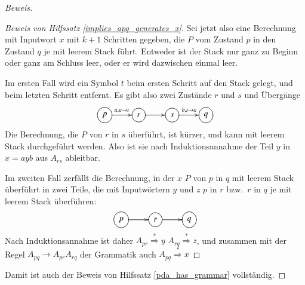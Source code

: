 \begin{proof}[Beweis]
\begin{proof}[Beweis von Hilfssatz \ref{implies_apq_generates_x}]
Sei jetzt also eine Berechnung mit Inputwort $x$
mit $k+1$ Schritten gegeben, die $P$ vom Zustand $p$ in den Zustand $q$ 
je mit leerem Stack führt. Entweder ist der Stack nur ganz zu
Beginn oder ganz am Schluss leer, oder er wird dazwischen einmal
leer.

Im ersten Fall wird ein Symbol $t$ beim ersten Schritt auf den Stack
gelegt, und beim letzten Schritt entfernt. Es gibt also zwei Zustände
$r$ und $s$ und Übergänge
\[
\entrymodifiers={++[o][F]}
\xymatrix{
p\ar[r]^{a,\varepsilon\to t}
	&r\ar[r]
		&s\ar[r]^{b,t\to\varepsilon}
			&q
}
\]
Die Berechnung, die $P$ von $r$ in $s$ überführt, ist kürzer, und kann
mit leerem Stack durchgeführt werden.
Also ist sie nach Induktionsannahme der Teil $y$ in $x=ayb$ aus
$A_{rs}$ ableitbar.

Im zweiten Fall zerfällt die Berechnung, in der $x$ $P$ von $p$ in
$q$  mit leerem Stack überführt in zwei Teile, die mit Inputwörtern
$y$ und $z$ $p$ in $r$ bzw.~$r$ in $q$ je mit leerem Stack überführen:
\[
\entrymodifiers={++[o][F]}
\xymatrix{
p\ar[r]
	&r\ar[r]
		&q
}
\]
Nach Induktionsannahme ist daher
$A_{pr}\overset{*}{\Rightarrow}y$
$A_{rq}\overset{*}{\Rightarrow}z$, und zusammen mit der Regel
$A_{pq}\to A_{pr}A_{rq}$ der Grammatik auch
$A_{pq}\overset{*}{\Rightarrow} x$
\end{proof}

Damit ist auch der Beweis von Hilfssatz \ref{pda_has_grammar} vollständig.
\end{proof}

